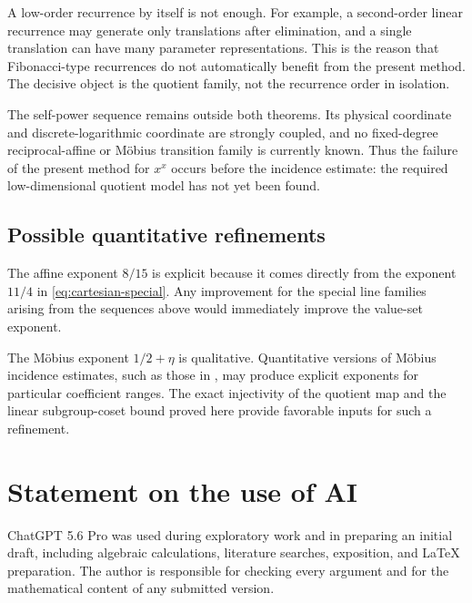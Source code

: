 \documentclass[11pt,reqno]{amsart}
\numberwithin{equation}{section}
\theoremstyle{definition}
\theoremstyle{remark}
\begin{document}
A low-order recurrence by itself is not enough.  For example, a second-order linear recurrence may generate only translations after elimination, and a single translation can have many parameter representations.  This is the reason that Fibonacci-type recurrences do not automatically benefit from the present method.  The decisive object is the quotient family, not the recurrence order in isolation.

The self-power sequence remains outside both theorems.  Its physical coordinate and discrete-logarithmic coordinate are strongly coupled, and no fixed-degree reciprocal-affine or M\"obius transition family is currently known.  Thus the failure of the present method for $x^x$ occurs before the incidence estimate: the required low-dimensional quotient model has not yet been found.

\subsection{Possible quantitative refinements}

The affine exponent $8/15$ is explicit because it comes directly from the exponent $11/4$ in \eqref{eq:cartesian-special}.  Any improvement for the special line families arising from the sequences above would immediately improve the value-set exponent.

The M\"obius exponent $1/2+\eta$ is qualitative.  Quantitative versions of M\"obius incidence estimates, such as those in \cite{Shkredov2021,RudnevWheeler2022,WarrenWheeler2023}, may produce explicit exponents for particular coefficient ranges.  The exact injectivity of the quotient map and the linear subgroup-coset bound proved here provide favorable inputs for such a refinement.

\section*{Statement on the use of AI}

ChatGPT 5.6 Pro was used during exploratory work and in preparing an initial draft, including algebraic calculations, literature searches, exposition, and LaTeX preparation.  The author is responsible for checking every argument and for the mathematical content of any submitted version.
\end{document}
